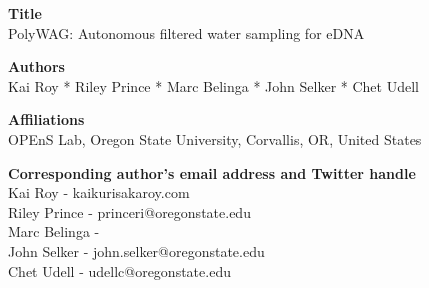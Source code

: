 \documentclass[11pt, letterpaper]{article}
\begin{document}
\begin{flushleft}



\setlength{\parindent}{0pt}
\setlength{\parskip}{10pt}
  

%
%
\textbf{Title} \\
PolyWAG: Autonomous filtered water sampling for eDNA 

%
%
\textbf{Authors} \\
Kai Roy * Riley Prince * Marc Belinga * John Selker * Chet Udell

%
%
\textbf{Affiliations} \\ 
OPEnS Lab, Oregon State University, Corvallis, OR, United States


%
%
\textbf{Corresponding author’s email address and Twitter handle}\\ 
Kai Roy - kaikurisakaroy\@gmail.com \\
Riley Prince - princeri@oregonstate.edu \\
Marc Belinga -  \\
John Selker - john.selker@oregonstate.edu \\
Chet Udell - udellc@oregonstate.edu



\end{flushleft}
\end{document}
